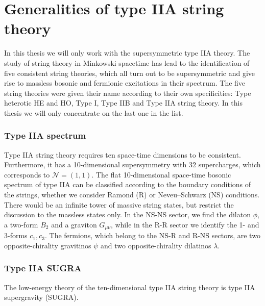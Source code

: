 \chapter{Generalities of type IIA string theory}

In this thesis we will only work with the supersymmetric type IIA theory. 
The study of string theory in Minkowski spacetime has lead to the identification of five consistent string theories, which all turn out to be supersymmetric and give rise to massless bosonic and fermionic excitations in their spectrum. The five string theories were given their name according to their own specificities: Type heterotic HE and HO, Type I, Type IIB and Type IIA string theory. In this thesis we will only concentrate on the last one in the list. 

\subsection{Type IIA spectrum}
Type IIA string theory requires ten space-time dimensions to be consistent.
Furthermore, it has a 10-dimensional supersymmetry with 32 supercharges, which corresponds to $\mathcal N=(1,1)$.
The flat 10-dimensional space-time bosonic spectrum of type IIA can be classified according to
the boundary conditions of the strings, whether we consider Ramond (R) or Neveu–Schwarz (NS) conditions.
There would be an infinite tower of massive string states, but restrict the discussion to the massless states only.
In the NS-NS sector, we find the dilaton $\phi$, a two-form $B_2$ and a graviton $G_{\mu\nu}$,
while in the R-R sector we identify the 1- and 3-forms $c_1, c_3$.
The fermions, which belong to the NS-R and R-NS sectors, are two opposite-chirality gravitinos $\psi$ and two opposite-chirality dilatinos $\lambda$.

\subsection{Type IIA SUGRA}
 
The low-energy theory of the ten-dimensional type IIA string theory is type IIA supergravity (SUGRA).

